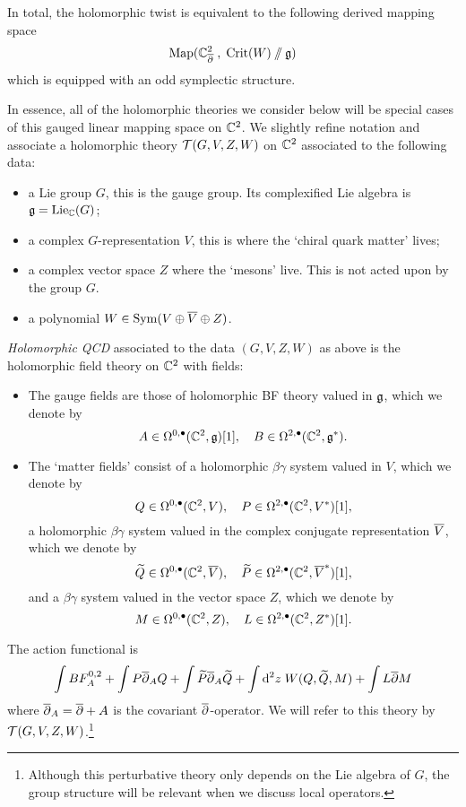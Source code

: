 \documentclass[11pt]{amsart}
\begin{document}
In total, the holomorphic twist is equivalent to the following derived mapping space
\[
{\rm Map}(\CC^2_{\dbar} \; , \; {\rm Crit}(W) \sslash \fg) 
\]
which is equipped with an odd symplectic structure. 

In essence, all of the holomorphic theories we consider below will be special cases of this gauged linear mapping space on $\CC^2$. 
We slightly refine notation and associate a holomorphic theory $\cT(G, V, Z, W)$ on $\CC^2$ associated to the following data:
\begin{itemize}
\item a Lie group $G$, this is the gauge group. 
Its complexified Lie algebra is $\fg = {\rm Lie}_\CC (G)$;
\item a complex $G$-representation $V$, this is where the `chiral quark matter' lives;
\item a complex vector space $Z$ where the `mesons' live.
This is not acted upon by the group $G$. 
\item a polynomial $W \in {\rm Sym}(V \oplus \Bar{V} \oplus Z)$.
\end{itemize}

\begin{dfn}
{\em Holomorphic QCD} associated to the data $(G,V,Z,W)$ as above is the holomorphic field theory on $\CC^2$ with fields:
\begin{itemize}
\item The gauge fields are those of holomorphic BF theory valued in $\fg$, which we denote by
\[
A \in \Omega^{0,\bu}(\CC^2 , \fg)[1] , \quad B \in \Omega^{2,\bu}(\CC^2, \fg^*) .
\]
\item The `matter fields' consist of a holomorphic $\beta\gamma$ system valued in $V$, which we denote by
\[
Q \in \Omega^{0,\bu}(\CC^2 , V) , \quad P \in \Omega^{2,\bu}(\CC^2 , V^*)[1] ,
\]
a holomorphic $\beta\gamma$ system valued in the complex conjugate representation $\Bar{V}$, which we denote by
\[
\Tilde{Q} \in \Omega^{0,\bu}(\CC^2 , \Bar{V}) , \quad \Tilde{P} \in \Omega^{2,\bu}(\CC^2 , \Bar{V}^*) [1],
\]
and a $\beta\gamma$ system valued in the vector space $Z$, which we denote by
\[
M \in \Omega^{0,\bu}(\CC^2 , Z) , \quad L \in \Omega^{2,\bu}(\CC^2 , Z^*) [1] .
\]
\end{itemize}

The action functional is
\[
\int B F^{0,2}_A + \int P \dbar_A Q + \int \Tilde{P} \dbar_A \Tilde{Q} + \int \d^2 z \; W(Q, \Tilde{Q}, M) + \int L \dbar M
\]
where $\dbar_A = \dbar + A$ is the covariant $\dbar$-operator. 
We will refer to this theory by $\cT(G,V,Z,W)$.\footnote{Although this perturbative theory only depends on the Lie algebra of $G$, the group structure will be relevant when we discuss local operators.} 
\end{dfn}
\end{document}
